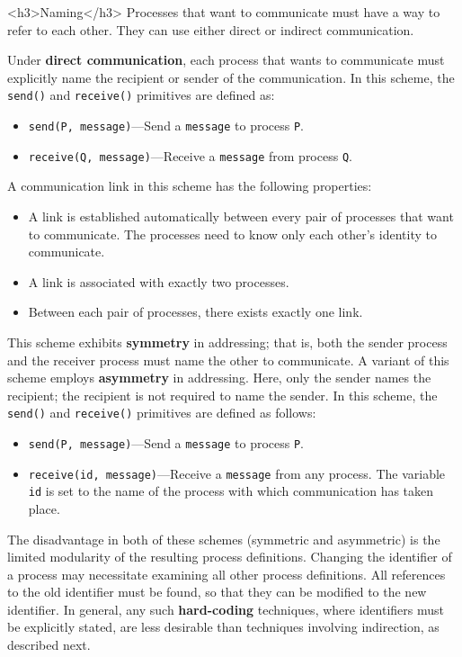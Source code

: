 <h3>Naming</h3>
Processes that want to communicate must have a way to refer to each other. They can use either direct or indirect communication.

Under \textbf{direct communication}, each process that wants to communicate must explicitly name the recipient or sender of the communication. In this scheme, the \texttt{send()} and \texttt{receive()} primitives are defined as:
\begin{itemize}
\item \texttt{send(P, message)}---Send a \texttt{message} to process \texttt{P}.
\item \texttt{receive(Q, message)}---Receive a \texttt{message} from process \texttt{Q}.
\end{itemize}
A communication link in this scheme has the following properties:
\begin{itemize}
\item A link is established automatically between every pair of processes that want to communicate. The processes need to know only each other's identity to communicate.
\item A link is associated with exactly two processes.
\item Between each pair of processes, there exists exactly one link.
\end{itemize}
This scheme exhibits \textbf{symmetry} in addressing; that is, both the sender process and the receiver process must name the other to communicate. A variant of this scheme employs \textbf{asymmetry} in addressing. Here, only the sender names the recipient; the recipient is not required to name the sender. In this scheme, the \texttt{send()} and \texttt{receive()} primitives are defined as follows:
\begin{itemize}
\item \texttt{send(P, message)}---Send a \texttt{message} to process \texttt{P}.
\item \texttt{receive(id, message)}---Receive a \texttt{message} from any process. The variable \texttt{id} is set to the name of the process with which communication has taken place.
\end{itemize}
The disadvantage in both of these schemes (symmetric and asymmetric) is the limited modularity of the resulting process definitions. Changing the identifier of a process may necessitate examining all other process definitions. All references to the old identifier must be found, so that they can be modified to the new identifier. In general, any such \textbf{hard-coding} techniques, where identifiers must be explicitly stated, are less desirable than techniques involving indirection, as described next.

